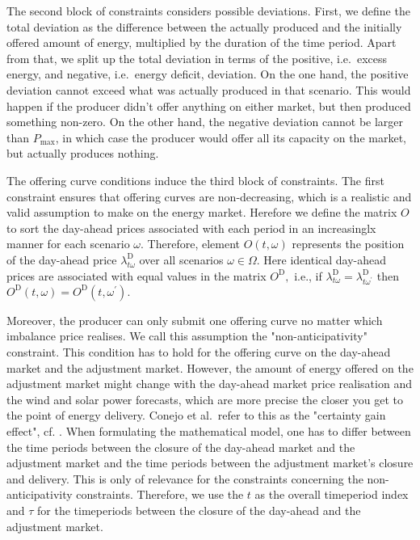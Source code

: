 The second block of constraints considers possible deviations. First, we define the total deviation as the difference between the actually produced and the initially offered amount of energy, multiplied by the duration of the time period. Apart from that, we split up the total deviation in terms of the positive, i.e.\ excess energy, and negative, i.e.\ energy deficit, deviation. On the one hand, the positive deviation cannot exceed what was actually produced in that scenario. This would happen if the producer didn't offer anything on either market, but then produced something non-zero. On the other hand, the negative deviation cannot be larger than $P_{\max}$, in which case the producer would offer all its capacity on the market, but actually produces nothing. 

The offering curve conditions induce the third block of constraints. The first constraint ensures that offering curves are non-decreasing, which is a realistic and valid assumption to make on the energy market. Herefore we define the matrix $O$ to sort the day-ahead prices associated with each period in an increasinglx manner for each scenario $\omega .$ Therefore, element $O(t, \omega)$ represents the position of the day-ahead price $\lambda_{t \omega}^{\mathrm{D}}$ over all scenarios $\omega \in \Omega$. Here identical day-ahead prices are associated with equal values in the matrix $O^{\mathrm{D}},$ i.e., if $\lambda_{t \omega}^{\mathrm{D}}=\lambda_{t \omega^{\prime}}^{\mathrm{D}}$ then $O^{\mathrm{D}}(t, \omega)=O^{\mathrm{D}}\left(t, \omega^{\prime}\right).$

Moreover, the producer can only submit one offering curve no matter which imbalance price realises. We call this assumption the "non-anticipativity" constraint. This condition has to hold for the offering curve on the day-ahead market and the adjustment market. However, the amount of energy offered on the adjustment market might change with the day-ahead market price realisation and the wind and solar power forecasts, which are more precise the closer you get to the point of energy delivery. Conejo et al.\ refer to this as the "certainty gain effect", cf. \cite{Conejo10}. When formulating the mathematical model, one has to differ between the
time periods between the closure of the day-ahead market and the adjustment market and
the time periods between the adjustment market's closure and delivery.  This is only of relevance for the constraints concerning the non-anticipativity constraints. Therefore, we use the $t$ as the overall timeperiod index and $\tau$ for the timeperiods between the closure of the day-ahead and the adjustment market.

